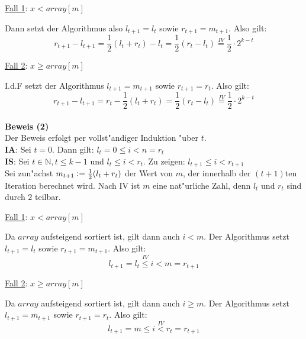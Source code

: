 \documentclass{scrartcl}
\newcommand{\defeq}{\vcentcolon=}
\begin{document}
\uline{Fall 1}: $x < array[m]$

Dann setzt der Algorithmus also $l_{t+1} = l_t$ sowie $r_{t+1} = m_{t+1}$. Also gilt:
\[r_{t+1} - l_{t+1} = \frac{1}{2}(l_t + r_t) - l_t = \frac{1}{2}(r_t - l_t) \overset{IV}{=} \frac{1}{2}\cdot 2^{k-t}\]

\uline{Fall 2}: $x \geq array[m]$

I.d.F setzt der Algorithmus $l_{t+1} = m_{t+1}$ sowie $r_{t+1} = r_t$. Also gilt:
\[r_{t+1} - l_{t+1} = r_t - \frac{1}{2}(l_t + r_t) = \frac{1}{2}(r_t - l_t) \overset{IV}{=} \frac{1}{2}\cdot 2^{k-t}\] \\[3em]

\noindent\textbf{Beweis (2)}\\

Der Beweis erfolgt per vollst"andiger Induktion "uber $t$.\\

\noindent\textbf{IA}: Sei $t = 0$. Dann gilt: $l_t = 0 \leq i < n = r_t$ \\
\textbf{IS}: Sei $t \in \mathbb{N}, t \leq k - 1$ und $l_t \leq i < r_t$. Zu zeigen: $l_{t+1} \leq i < r_{t+1}$ \\

Sei zun"achst $m_{t+1} \defeq \frac{1}{2}(l_t + r_t)$ der Wert von $m$, der innerhalb der $(t+1)$ten Iteration berechnet wird.
Nach IV ist $m$ eine nat"urliche Zahl, denn $l_t$ und $r_t$ sind durch $2$ teilbar.

\uline{Fall 1}: $x < array[m]$

Da $array$ aufsteigend sortiert ist, gilt dann auch $i < m$.
Der Algorithmus setzt $l_{t+1} = l_t$ sowie $r_{t+1} = m_{t+1}$. Also gilt:
\[l_{t+1} = l_t \overset{IV}{\leq} i < m = r_{t+1}\]

\uline{Fall 2}: $x \geq array[m]$

Da $array$ aufsteigend sortiert ist, gilt dann auch $i \geq m$.
Der Algorithmus setzt $l_{t+1} = m_{t+1}$ sowie $r_{t+1} = r_t$. Also gilt:
\[l_{t+1} = m \leq i \overset{IV}{<} r_t = r_{t+1}\]
\end{document}
